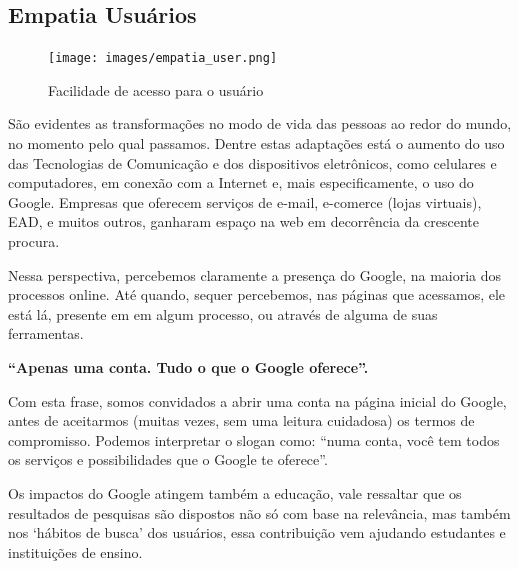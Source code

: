\documentclass[a4paper]{article}
\begin{document}
\subsection{Empatia Usuários}
\begin{figure}[h]
    \centering
    \texttt{[image: images/empatia\_user.png]}
    \caption{Facilidade de acesso para o usuário}
\end{figure}
\par São evidentes as transformações no modo de vida das pessoas ao redor do mundo, no momento pelo qual passamos. Dentre estas adaptações está o aumento do uso das Tecnologias de Comunicação e dos dispositivos eletrônicos, como celulares e computadores, em conexão com a Internet e, mais especificamente, o uso do Google. Empresas que oferecem serviços de e-mail, e-comerce (lojas virtuais), EAD, e muitos outros, ganharam espaço na web em decorrência da crescente procura.
\par Nessa perspectiva, percebemos claramente a presença do Google, na maioria dos processos online. Até quando, sequer percebemos, nas páginas que acessamos, ele está lá, presente em em algum processo, ou através de alguma de suas ferramentas.\\
\begin{center}
    \textbf{\large “Apenas uma conta. Tudo o que o Google oferece”.}\\[0.8cm]
\end{center}
\par Com esta frase, somos convidados a abrir uma conta na página inicial do Google, antes de aceitarmos (muitas vezes, sem uma leitura cuidadosa) os termos de compromisso. Podemos interpretar o slogan como: “numa conta, você tem todos os serviços e possibilidades que o Google te oferece”. 
\par Os impactos do Google atingem também a educação, vale ressaltar que os resultados de pesquisas são dispostos não só com base na relevância, mas também nos ‘hábitos de busca’ dos usuários, essa contribuição vem ajudando estudantes e instituições de ensino.\\[1.5cm]
\end{document}
